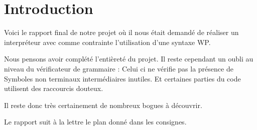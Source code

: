 \section{Introduction}
	Voici le rapport final de notre projet où il nous était demandé de
	réaliser un interpréteur avec comme contrainte l'utilisation d'une
	syntaxe WP. 

	Nous pensons avoir complété l'entièreté du projet. Il reste cependant
	un oubli au niveau du vérificateur de grammaire : Celui ci ne vérifie
	pas la présence de Symboles non terminaux intermédiaires inutiles. Et
	certaines parties du code utilisent des raccourcis douteux. 
	
	Il reste donc très certainement de nombreux bogues à découvrir.

	Le rapport suit à la lettre le plan donné dans les consignes. 

